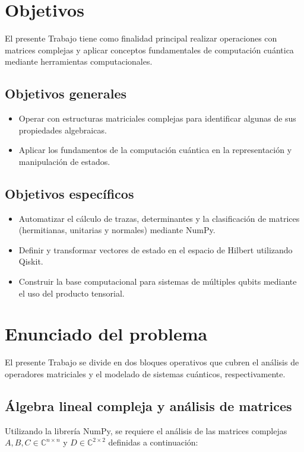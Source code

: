 \documentclass[11pt,a4paper,spanish]{book}
\begin{document}
\chapter{Objetivos}

El presente Trabajo tiene como finalidad principal realizar operaciones con matrices complejas y aplicar conceptos fundamentales de computación cuántica mediante herramientas computacionales.

\section{Objetivos generales}
\begin{itemize}
    \item Operar con estructuras matriciales complejas para identificar algunas de sus propiedades algebraicas.
    \item Aplicar los fundamentos de la computación cuántica en la representación y manipulación de estados.
\end{itemize}

\section{Objetivos específicos}
\begin{itemize}
    \item Automatizar el cálculo de trazas, determinantes y la clasificación de matrices (hermitianas, unitarias y normales) mediante NumPy.
    \item Definir y transformar vectores de estado en el espacio de Hilbert utilizando Qiskit.
    \item Construir la base computacional para sistemas de múltiples qubits mediante el uso del producto tensorial.
\end{itemize}


\chapter{Enunciado del problema}

El presente Trabajo se divide en dos bloques operativos que cubren el análisis de operadores matriciales y el modelado de sistemas cuánticos, respectivamente.

\section{Álgebra lineal compleja y análisis de matrices}
Utilizando la librería NumPy, se requiere el análisis de las matrices complejas $A, B, C \in \mathbb{C}^{n \times n}$ y $D \in \mathbb{C}^{2 \times 2}$ definidas a continuación:
\end{document}
